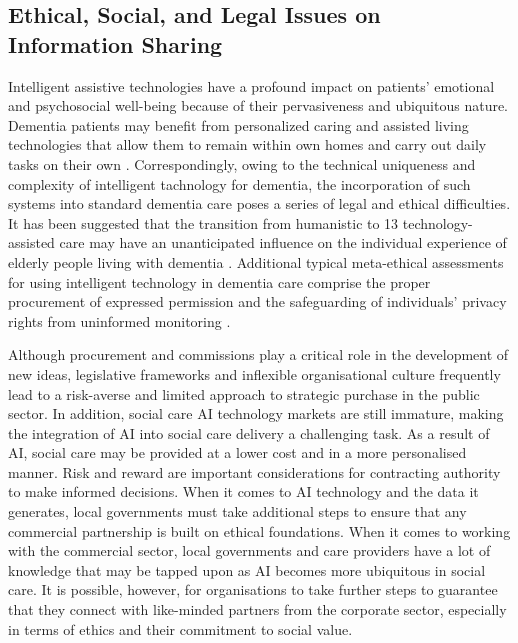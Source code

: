 \subsection{Ethical, Social, and Legal Issues on Information Sharing}
Intelligent assistive technologies have a profound impact on patients’ emotional and psychosocial well-being because of their pervasiveness and ubiquitous nature. Dementia patients may benefit from personalized caring and assisted living technologies that allow them to remain within own homes and carry out daily tasks on their own \citep{leg1}. Correspondingly, owing to the technical uniqueness and complexity of intelligent tachnology for dementia, the incorporation of such systems into standard dementia care poses a series of legal and ethical difficulties. It has been suggested that the transition from humanistic to 13 technology-assisted care may have an unanticipated influence on the individual experience of elderly people living with dementia \citep{leg2}. Additional typical meta-ethical assessments for using intelligent technology in dementia care comprise the proper procurement of expressed permission \citep{leg3} and the safeguarding of individuals’ privacy rights from uninformed monitoring \citep{leg4}.

Although procurement and commissions play a critical role in the development of new ideas, legislative frameworks and inflexible organisational culture frequently lead to a risk-averse and limited approach to strategic purchase in the public sector. In addition, social care AI technology markets are still immature, making the integration of AI into social care delivery a challenging task. As a result of AI, social care may be provided at a lower cost and in a more personalised manner. Risk and reward are important considerations for contracting authority to make informed decisions. When it comes to AI technology and the data it generates, local governments must take additional steps to ensure that any commercial partnership is built on ethical foundations. When it comes to working with the commercial sector, local governments and care providers have a lot of knowledge that may be tapped upon as AI becomes more ubiquitous in social care. It is possible, however, for organisations to take further steps to guarantee that they connect with like-minded partners from the corporate sector, especially in terms of ethics and their commitment to social value.

